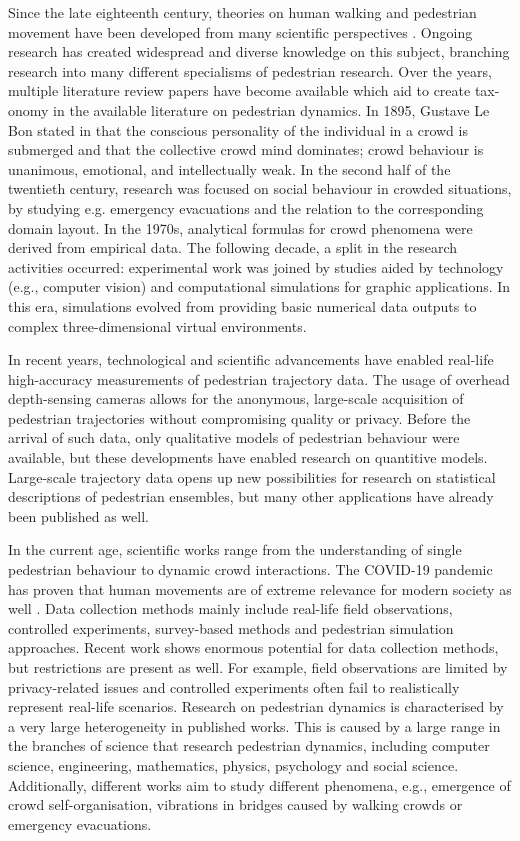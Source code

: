 \documentclass[class=article, crop=false]{standalone}
\begin{document}
Since the late eighteenth century, theories on human walking and pedestrian movement have been developed from many scientific perspectives \cite{science_walking}. Ongoing research has created widespread and diverse knowledge on this subject, branching research into many different specialisms of pedestrian research. Over the years, multiple literature review papers \cite{modelling_artificialped,crowdmotion_sota} have become available which aid to create tax- onomy in the available literature on pedestrian dynamics.
In 1895, Gustave Le Bon stated in \cite{LeBon_mind} that the conscious personality of the individual in a crowd is submerged and that the collective crowd mind dominates; crowd behaviour is unanimous, emotional, and intellectually weak. In the second half of the twentieth century, research was focused on social behaviour in crowded situations, by studying e.g. emergency evacuations and the relation to the corresponding domain layout. In the 1970s, analytical formulas for crowd phenomena were derived from empirical data. The following decade, a split in the research activities occurred: experimental work was joined by studies aided by technology (e.g., computer vision) and computational simulations for graphic applications. In this era, simulations evolved from providing basic numerical data outputs to complex three-dimensional virtual environments.

In recent years, technological and scientific advancements have enabled real-life high-accuracy measurements of pedestrian trajectory data. The usage of overhead depth-sensing cameras \cite{Xovis} allows for the anonymous, large-scale acquisition of pedestrian trajectories without compromising quality or privacy. Before the arrival of such data, only qualitative models of pedestrian behaviour were available, but these developments have enabled research on quantitive models. Large-scale trajectory data opens up new possibilities for research on statistical descriptions of pedestrian ensembles, but many other applications have already been published \cite{CorbTosc_1,CorbTosc_2,CorbTosc_3} as well.

In the current age, scientific works range from the understanding of single pedestrian behaviour to dynamic crowd interactions. The COVID-19 pandemic has proven that human movements are of extreme relevance for modern society as well \cite{physical_distance}. Data collection methods mainly include real-life field observations, controlled experiments, survey-based methods and pedestrian simulation approaches. Recent work shows enormous potential for data collection methods, but restrictions are present as well. For example, field observations are limited by privacy-related issues and controlled experiments often fail to realistically represent real-life scenarios.
Research on pedestrian dynamics is characterised by a very large heterogeneity in published works. This is caused by a large range in the branches of science that research pedestrian dynamics, including computer science, engineering, mathematics, physics, psychology and social science. Additionally, different works aim to study different phenomena, e.g., emergence of crowd self-organisation, vibrations in bridges caused by walking crowds or emergency evacuations.
\end{document}

